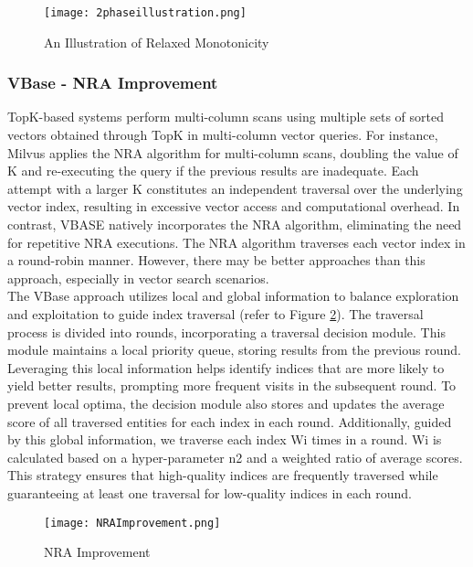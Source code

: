 \documentclass[conference]{IEEEtran}
\begin{document}
\begin{figure}[h!]
  \centering
  \texttt{[image: 2phaseillustration.png]}
  \caption{An Illustration of Relaxed Monotonicity \cite{288618}}
  \label{fig: An Illustration of Relaxed Monotonicity}
\end{figure}
\subsubsection{VBase - NRA Improvement}
\cite{288618} TopK-based systems perform multi-column scans using multiple sets of sorted vectors obtained through TopK in multi-column vector queries. For instance, Milvus applies the NRA \cite{DBLP:journals/corr/cs-DB-0204046} algorithm for multi-column scans, doubling the value of K and re-executing the query if the previous results are inadequate. Each attempt with a larger K constitutes an independent traversal over the underlying vector index, resulting in excessive vector access and computational overhead. In contrast, VBASE natively incorporates the NRA algorithm, eliminating the need for repetitive NRA executions. The NRA algorithm traverses each vector index in a round-robin manner. However, there may be better approaches than this approach, especially in vector search scenarios.
\\
The VBase approach utilizes local and global information to balance exploration and exploitation to guide index traversal (refer to Figure \ref{fig: NRA Improvement}). The traversal process is divided into rounds, incorporating a traversal decision module. This module maintains a local priority queue, storing results from the previous round. Leveraging this local information helps identify indices that are more likely to yield better results, prompting more frequent visits in the subsequent round. To prevent local optima, the decision module also stores and updates the average score of all traversed entities for each index in each round.
Additionally, guided by this global information, we traverse each index Wi times in a round. Wi is calculated based on a hyper-parameter n2 and a weighted ratio of average scores. This strategy ensures that high-quality indices are frequently traversed while guaranteeing at least one traversal for low-quality indices in each round.
\begin{figure}[h!]
  \centering
  \texttt{[image: NRAImprovement.png]}
  \caption{NRA Improvement \cite{288618}}
  \label{fig: NRA Improvement}
\end{figure}
\end{document}
